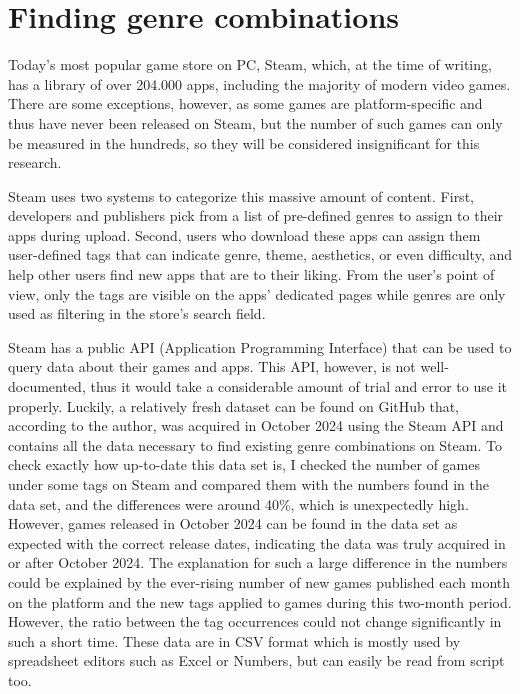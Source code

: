 \section{Finding genre combinations}

Today's most popular game store on PC, Steam\cite{steam}, which, at the time of writing, has a library of over 204.000 apps, including the majority of modern video games. There are some exceptions, however, as some games are platform-specific and thus have never been released on Steam, but the number of such games can only be measured in the hundreds, so they will be considered insignificant for this research.

Steam uses two systems to categorize this massive amount of content. First, developers and publishers pick from a list of pre-defined genres to assign to their apps during upload. Second, users who download these apps can assign them user-defined tags that can indicate genre, theme, aesthetics, or even difficulty, and help other users find new apps that are to their liking. From the user's point of view, only the tags are visible on the apps' dedicated pages while genres are only used as filtering in the store's search field.

Steam has a public API (Application Programming Interface) that can be used to query data about their games and apps. This API, however, is not well-documented, thus it would take a considerable amount of trial and error to use it properly. Luckily, a relatively fresh dataset\cite{steamCatalogInsight2024} can be found on GitHub that, according to the author, was acquired in October 2024 using the Steam API and contains all the data necessary to find existing genre combinations on Steam. To check exactly how up-to-date this data set is, I checked the number of games under some tags on Steam and compared them with the numbers found in the data set, and the differences were around 40\%, which is unexpectedly high. However, games released in October 2024 can be found in the data set as expected with the correct release dates, indicating the data was truly acquired in or after October 2024. The explanation for such a large difference in the numbers could be explained by the ever-rising number of new games published each month on the platform and the new tags applied to games during this two-month period. However, the ratio between the tag occurrences could not change significantly in such a short time. These data are in CSV format which is mostly used by spreadsheet editors such as Excel or Numbers, but can easily be read from script too.

